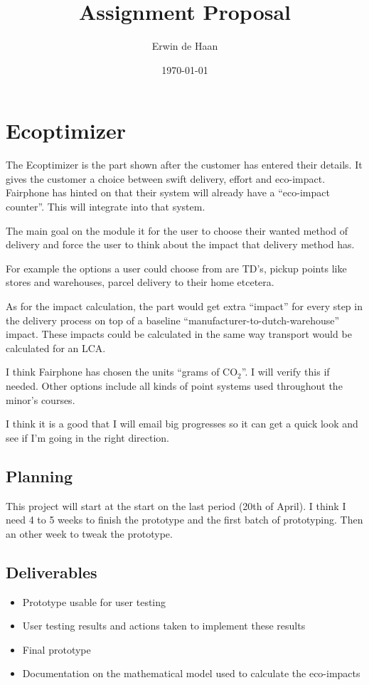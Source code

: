 \documentclass[final,a4paper,11pt]{article}
\author{Erwin de Haan}
\title{Assignment Proposal}
\date{\today}
\begin{document}
\maketitle

\section{Ecoptimizer}
The Ecoptimizer is the part shown after the customer has entered their details.
It gives the customer a choice between swift delivery, effort and eco-impact.
Fairphone has hinted on that their system will already have a ``eco-impact counter''.
This will integrate into that system.

The main goal on the module it for the user to choose their wanted method of delivery and force the user to think about the impact that delivery method has.

For example the options a user could choose from are TD's, pickup points like stores and warehouses, parcel delivery to their home etcetera.

As for the impact calculation, the part would get extra ``impact'' for every step in the delivery process on top of a baseline ``manufacturer-to-dutch-warehouse'' impact.
These impacts could be calculated in the same way transport would be calculated for an LCA.

I think Fairphone has chosen the units ``grams of $\textrm{CO}_\textrm{2}$''.
I will verify this if needed.
Other options include all kinds of point systems used throughout the minor's courses.

I think it is a good that I will email big progresses so it can get a quick look and see if I'm going in the right direction.

\subsection{Planning}
This project will start at the start on the last period (20th of April).
I think I need 4 to 5 weeks to finish the prototype and the first batch of prototyping.
Then an other week to tweak the prototype.

\subsection{Deliverables}
\begin{itemize}
	\item Prototype usable for user testing
	\item User testing results and actions taken to implement these results
	\item Final prototype
	\item Documentation on the mathematical model used to calculate the eco-impacts
\end{itemize}
\end{document}
